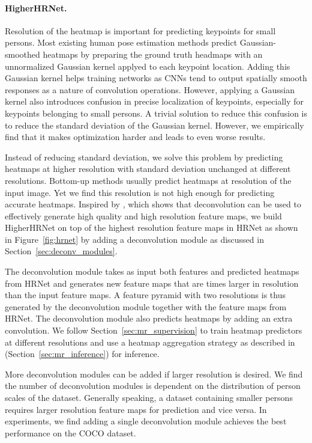 \documentclass[10pt,twocolumn,letterpaper]{article}
\begin{document}
\paragraph{HigherHRNet.} 
Resolution of the heatmap is important for predicting keypoints for small persons. Most existing human pose estimation methods predict Gaussian-smoothed heatmaps by preparing the ground truth headmaps with an unnormalized Gaussian kernel applyed to each keypoint location. Adding this Gaussian kernel helps training networks as CNNs tend to output spatially smooth responses as a nature of convolution operations. However, applying a Gaussian kernel also introduces confusion in precise localization of keypoints, especially for keypoints belonging to small persons. A trivial solution to reduce this confusion is to reduce the standard deviation of the Gaussian kernel. However, we empirically find that it makes optimization harder and leads to even worse results. 

Instead of reducing standard deviation, we solve this problem by predicting heatmaps at higher resolution with standard deviation unchanged at different resolutions. Bottom-up methods usually predict heatmaps at resolution  of the input image. Yet we find this resolution is not high enough for predicting accurate heatmaps. Inspired by \cite{xiao2018simple}, which shows that deconvolution can be used to effectively generate high quality and high resolution feature maps, we build HigherHRNet on top of the highest resolution feature maps in HRNet as shown in Figure~\ref{fig:hrnet} by adding a deconvolution module as discussed in Section~\ref{sec:deconv_modules}.

The deconvolution module takes as input both features and predicted heatmaps from HRNet and generates new feature maps that are  times larger in resolution than the input feature maps. A feature pyramid with two resolutions is thus generated by the deconvolution module together with the feature maps from HRNet. The deconvolution module also predicts heatmaps by adding an extra  convolution. We follow Section~\ref{sec:mr_supervision} to train heatmap predictors at different resolutions and use a heatmap aggregation strategy as described in (Section~\ref{sec:mr_inference}) for inference.

More deconvolution modules can be added if larger resolution is desired. We find the number of deconvolution modules is dependent on the distribution of person scales of the dataset. Generally speaking, a dataset containing smaller persons requires larger resolution feature maps for prediction and vice versa. In experiments, we find adding a single deconvolution module achieves the best performance on the COCO dataset.
\end{document}
